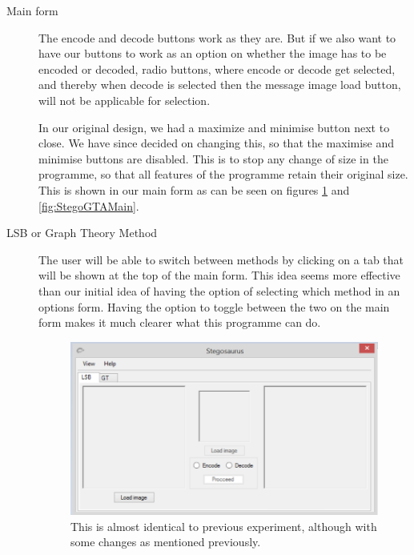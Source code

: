 \begin{description}
\item[Main form]
The encode and decode buttons work as they are.
But if we also want to have our buttons to work as an option on whether the image has to be encoded or decoded, radio buttons, where encode or decode get selected, and thereby when decode is selected then the message image load button, will not be applicable for selection.

In our original design, we had a maximize and minimise button next to close.
We have since decided on changing this, so that the maximise and minimise buttons are disabled.
This is to stop any change of size in the programme, so that all features of the programme retain their original size.
This is shown in our main form as can be seen on figures \ref{fig:StegoLSBMain} and \ref{fig:StegoGTAMain}.

\item[LSB or Graph Theory Method]
The user will be able to switch between methods by clicking on a tab that will be shown at the top of the main form.
This idea seems more effective than our initial idea of having the option of selecting which method in an options form.
Having the option to toggle between the two on the main form makes it much clearer what this programme can do.

\begin{figure}
	\centering
	\includegraphics[width=1\textwidth]{figures/StegoLSBMain.png}
	\caption{This is almost identical to previous experiment, although with some changes as mentioned previously.}
	\label{fig:StegoLSBMain}
\end{figure}


\end{description}
